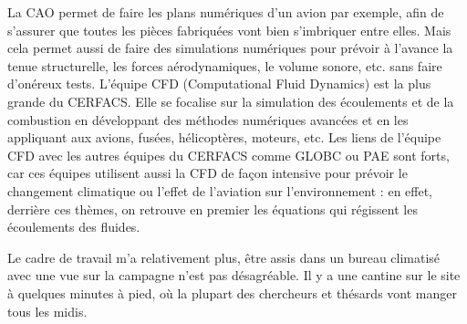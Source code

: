 La CAO permet de faire les plans numériques d'un avion par exemple, afin de s'assurer que toutes les pièces fabriquées vont bien s'imbriquer entre elles. Mais cela permet aussi de faire des simulations numériques pour prévoir à l'avance la tenue structurelle, les forces aérodynamiques, le volume sonore, etc. sans faire d'onéreux tests.
L'équipe CFD (Computational Fluid Dynamics) est la plus grande du CERFACS. Elle se focalise sur la simulation des écoulements et de la combustion en développant des méthodes numériques avancées et en les appliquant aux avions, fusées, hélicoptères, moteurs, etc. Les liens de l’équipe CFD avec les autres équipes du CERFACS comme GLOBC ou PAE  sont forts, car ces équipes utilisent aussi la CFD de façon intensive pour prévoir le changement climatique ou l’effet de l’aviation sur l’environnement : en effet, derrière ces thèmes, on retrouve en premier les équations qui régissent les écoulements des fluides.






Le cadre de travail m'a relativement plus, être assis dans un bureau climatisé avec une vue sur la campagne n'est pas désagréable. Il y a une cantine sur le site à quelques minutes à pied, où la plupart des chercheurs et thésards vont manger tous les midis.



